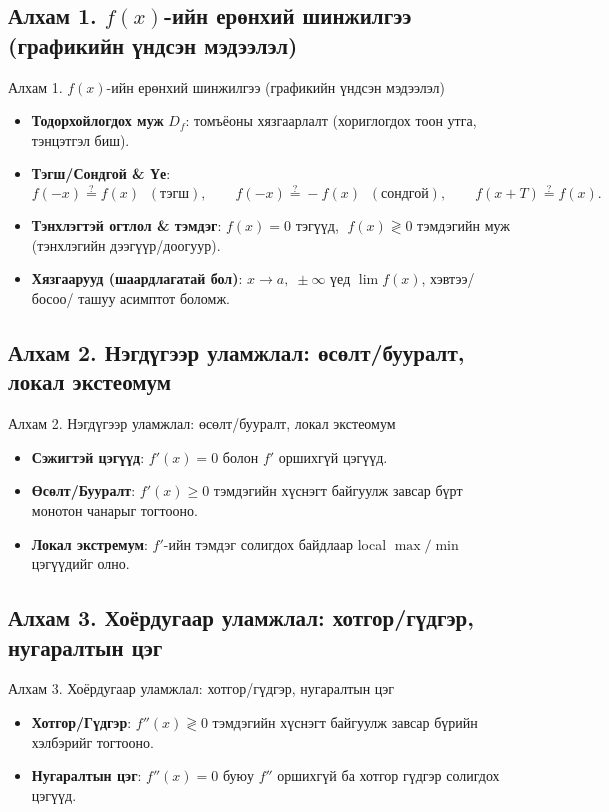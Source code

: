 \subsection*{Алхам 1. $f(x)$-ийн ерөнхий шинжилгээ (графикийн үндсэн мэдээлэл)}
\begin{frame}[allowframebreaks]{Алхам 1. $f(x)$-ийн ерөнхий шинжилгээ (графикийн үндсэн мэдээлэл)}
\begin{itemize}
  \item \textbf{Тодорхойлогдох муж} $D_f$: томъёоны хязгаарлалт (хориглогдох тоон утга, тэнцэтгэл биш).
  \item \textbf{Тэгш/Сондгой \& Үе}: 
  \[
    f(-x)\stackrel{?}{=}f(x)\;\;(\text{тэгш}), \qquad
    f(-x)\stackrel{?}{=}-f(x)\;\;(\text{сондгой}), \qquad
    f(x+T)\stackrel{?}{=}f(x).
  \]
  \item \textbf{Тэнхлэгтэй огтлол \& тэмдэг}: $f(x)=0$ тэгүүд, $\;f(x)\gtrless 0$ тэмдэгийн муж (тэнхлэгийн дээгүүр/доогуур).
  \item \textbf{Хязгаарууд (шаардлагатай бол)}: $x\to a,\;\pm\infty$ үед $\lim f(x)$, хэвтээ/босоо/ ташуу асимптот боломж.
\end{itemize}
\end{frame}

\subsection*{Алхам 2. Нэгдүгээр уламжлал: өсөлт/бууралт, локал экстеомум}
\begin{frame}[allowframebreaks]{Алхам 2. Нэгдүгээр уламжлал: өсөлт/бууралт, локал экстеомум}
\begin{itemize}
  \item \textbf{Сэжигтэй цэгүүд}: $f'(x)=0$ болон $f'$ оршихгүй цэгүүд.
  \item \textbf{Өсөлт/Бууралт}: $f'(x)\geq 0$ тэмдэгийн хүснэгт байгуулж завсар бүрт монотон чанарыг тогтооно.
  \item \textbf{Локал экстремум}: $f'$-ийн тэмдэг солигдох байдлаар local \(\max/\min\) цэгүүдийг олно.
\end{itemize}
\end{frame}

\subsection*{Алхам 3. Хоёрдугаар уламжлал: хотгор/гүдгэр, нугаралтын цэг}
\begin{frame}[allowframebreaks]{Алхам 3. Хоёрдугаар уламжлал: хотгор/гүдгэр, нугаралтын цэг}
\begin{itemize}
  \item \textbf{Хотгор/Гүдгэр}: $f''(x)\gtrless 0$ тэмдэгийн хүснэгт байгуулж завсар бүрийн хэлбэрийг тогтооно.
  \item \textbf{Нугаралтын цэг}: $f''(x)=0$ буюу $f''$ оршихгүй ба  хотгор гүдгэр солигдох цэгүүд.
\end{itemize}
\end{frame}

